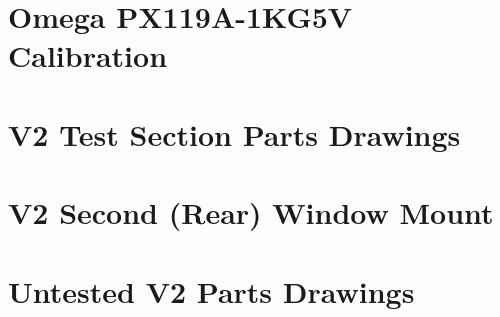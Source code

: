 \documentclass[12pt,letterpaper,twoside]{report}
\begin{document}
    \chapter{Omega PX119A-1KG5V Calibration}
        \label{chp:omega calibration}
        
    \chapter{V2 Test Section Parts Drawings}
        \label{chp:V2 Test Section Drawings}
        
    \chapter{V2 Second (Rear) Window Mount}
        \label{chp:V2 rear window mount}
        
    \chapter{Untested V2 Parts Drawings}
        \label{chp:Extension cylinder}
        \label{chp:remachined inner cylinder}
        \label{chp:New nozzle}
        \label{chp:Exchangeable nozzle plate}
        \label{chp:thicker plate}

    
\end{document}

